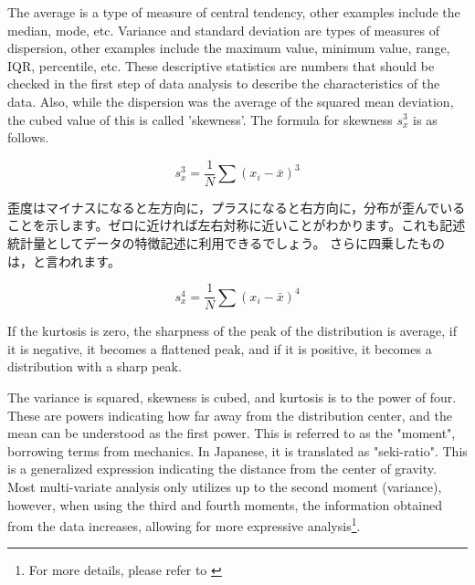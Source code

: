 \documentclass{ltjsbook}
\begin{document}
The average is a type of measure of central tendency, other examples include the median, mode, etc. Variance and standard deviation are types of measures of dispersion, other examples include the maximum value, minimum value, range, IQR, percentile, etc. These descriptive statistics are numbers that should be checked in the first step of data analysis to describe the characteristics of the data.
Also, while the dispersion was the average of the squared mean deviation, the cubed value of this is called 'skewness'. The formula for skewness $s_x^3$ is as follows.

\[ s_x^3 = \frac{1}{N}\sum (x_i - \bar{x})^3 \]

歪度はマイナスになると左方向に，プラスになると右方向に，分布が歪んでいることを示します。ゼロに近ければ左右対称に近いことがわかります。これも記述統計量としてデータの特徴記述に利用できるでしょう。
さらに四乗したものは，と言われます。

\[ s_x^4 = \frac{1}{N}\sum (x_i - \bar{x})^4 \]

If the kurtosis is zero, the sharpness of the peak of the distribution is average, if it is negative, it becomes a flattened peak, and if it is positive, it becomes a distribution with a sharp peak.

The variance is squared, skewness is cubed, and kurtosis is to the power of four. These are powers indicating how far away from the distribution center, and the mean can be understood as the first power. This is referred to as the "moment", borrowing terms from mechanics. In Japanese, it is translated as "seki-ratio". This is a generalized expression indicating the distance from the center of gravity. Most multi-variate analysis only utilizes up to the second moment (variance), however, when using the third and fourth moments, the information obtained from the data increases, allowing for more expressive analysis\footnote{For more details, please refer to \textcite{Toyoda2007}}.
\end{document}
